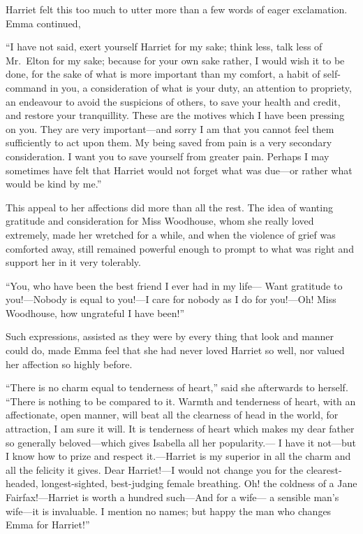 Harriet felt this too much to utter more than a few words
of eager exclamation.  Emma continued,

``I have not said, exert yourself Harriet for my sake; think less,
talk less of Mr.\ Elton for my sake; because for your own sake rather,
I would wish it to be done, for the sake of what is more important
than my comfort, a habit of self-command in you, a consideration
of what is your duty, an attention to propriety, an endeavour
to avoid the suspicions of others, to save your health and credit,
and restore your tranquillity.  These are the motives which I
have been pressing on you.  They are very important---and sorry
I am that you cannot feel them sufficiently to act upon them.
My being saved from pain is a very secondary consideration.  I want
you to save yourself from greater pain.  Perhaps I may sometimes
have felt that Harriet would not forget what was due---or rather
what would be kind by me.''

This appeal to her affections did more than all the rest.
The idea of wanting gratitude and consideration for Miss Woodhouse,
whom she really loved extremely, made her wretched for a while,
and when the violence of grief was comforted away, still remained
powerful enough to prompt to what was right and support her in it
very tolerably.

``You, who have been the best friend I ever had in my life---%
Want gratitude to you!---Nobody is equal to you!---I care for nobody
as I do for you!---Oh!  Miss Woodhouse, how ungrateful I have been!''

Such expressions, assisted as they were by every thing that look
and manner could do, made Emma feel that she had never loved Harriet
so well, nor valued her affection so highly before.

``There is no charm equal to tenderness of heart,'' said she
afterwards to herself.  ``There is nothing to be compared to it.
Warmth and tenderness of heart, with an affectionate, open manner,
will beat all the clearness of head in the world, for attraction,
I am sure it will.  It is tenderness of heart which makes my dear
father so generally beloved---which gives Isabella all her popularity.---%
I have it not---but I know how to prize and respect it.---Harriet is
my superior in all the charm and all the felicity it gives.
Dear Harriet!---I would not change you for the clearest-headed,
longest-sighted, best-judging female breathing.  Oh! the coldness
of a Jane Fairfax!---Harriet is worth a hundred such---And for a wife---%
a sensible man's wife---it is invaluable.  I mention no names;
but happy the man who changes Emma for Harriet!''



